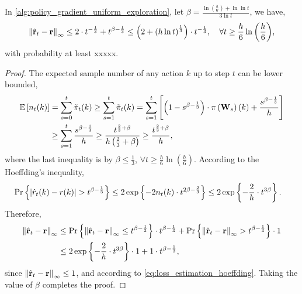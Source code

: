 \begin{thm}
\label{thm:reward_estimation_hoeffding}
    In \cref{alg:policy_gradient_uniform_exploration}, let $\beta = \frac{ \ln{\left(\frac{h}{6}\right) + \ln{\ln{t}} } }{ 3 \ln{t}}$, we have,
\begin{equation*}
    \left\| \hat{{\mathbf{r}}}_t - {\mathbf{r}} \right\|_\infty \le 2 \cdot t^{- \frac{1}{3}} + t^{\beta - \frac{1}{3}} \le \left( 2 + \left( h \ln{t} \right) ^\frac{1}{3} \right) \cdot t^{- \frac{1}{3}}, \quad \forall t \ge \frac{h}{6} \ln{\left(\frac{h}{6}\right) },
\end{equation*}
with probability at least xxxxx.
\end{thm}
\begin{proof}
    The expected sample number of any action $k$ up to step $t$ can be lower bounded,
\begin{equation*}
\begin{split}
    \operatorname*{{\mathbb{E}}}{\left[ n_t(k) \right]} &= \sum\limits_{s=0}^{t}{ \tilde{\pi}_t(k)} \ge \sum\limits_{s=1}^{t}{ \tilde{\pi}_t(k)} = \sum\limits_{s=1}^{t}{ \left[ \left( 1 - s^{\beta - \frac{1}{3}} \right) \cdot \pi\left({\mathbf{W}}_{s}\right)(k) + \frac{s^{\beta - \frac{1}{3}}}{h} \right] } \\
    &\ge \sum\limits_{s=1}^{t}{ \frac{s^{\beta - \frac{1}{3}}}{h} } \ge \frac{t^{\frac{2}{3} + \beta}}{ h  \left(\frac{2}{3} + \beta \right) } \ge \frac{t^{\frac{2}{3} + \beta}}{ h },
\end{split}
\end{equation*}
where the last inequality is by $\beta \le \frac{1}{3}$, $\forall t \ge \frac{h}{6} \ln{\left(\frac{h}{6}\right) }$.
According to the Hoeffding's inequality,
\begin{equation}
\label{eq:loss_estimation_hoeffding}
\begin{split}
    {\text{Pr}}\left\{ \left| \hat{r}_{t}(k) - r(k) \right| > t^{\beta - \frac{1}{3}} \right\} &\le 2 \exp\left\{ - 2 n_{t}(k) \cdot t^{2\beta - \frac{2}{3}} \right\} \le 2 \exp\left\{ - \frac{2}{ h } \cdot t^{3\beta} \right\}.
\end{split}
\end{equation}
Therefore,
\begin{equation*}
\begin{split}
    \left\| \hat{{\mathbf{r}}}_t - {\mathbf{r}} \right\|_\infty &\le {\text{Pr}}\left\{ \left\| \hat{{\mathbf{r}}}_t - {\mathbf{r}} \right\|_\infty \le t^{\beta - \frac{1}{3}} \right\} \cdot t^{\beta - \frac{1}{3}} + {\text{Pr}}\left\{ \left\| \hat{{\mathbf{r}}}_t - {\mathbf{r}} \right\|_\infty > t^{\beta - \frac{1}{3}} \right\} \cdot 1 \\
    &\le 2 \exp\left\{ - \frac{2}{ h } \cdot t^{3\beta} \right\} \cdot 1 + 1 \cdot t^{\beta - \frac{1}{3}},
\end{split}
\end{equation*}
since $\left\| \hat{{\mathbf{r}}}_t - {\mathbf{r}} \right\|_\infty \le 1$, and according to \cref{eq:loss_estimation_hoeffding}. Taking the value of $\beta$ completes the proof.
\end{proof}

